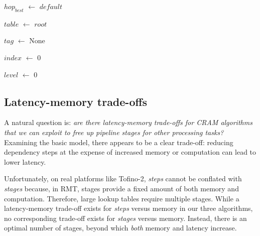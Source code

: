 \begin{algorithm}[h]

    $hop_{best}$ $\leftarrow$ $default$
    
    $table$ $\leftarrow$ $root$

    $tag$ $\leftarrow$ None
    
    $index$ $\leftarrow$ 0

    $level$ $\leftarrow$ 0

    \caption{\textbf{\mashup Lookup} ($addr$, $strides$)} \label{alg:mashup_lookup}
\end{algorithm}


\subsection{Latency-memory trade-offs} \label{subsec:tradeoff}

A natural question is: {\em are there latency-memory trade-offs for CRAM algorithms that we can exploit to free up pipeline stages for other processing tasks?} Examining the basic \cram model, there appears to be a clear trade-off: reducing dependency steps at the expense of increased memory or computation can lead to lower latency. 

Unfortunately, on real platforms like Tofino-2, {\em steps} cannot be conflated with {\em stages} because, in RMT, stages provide a fixed amount of both memory and computation. Therefore, large lookup tables require multiple stages. While a latency-memory trade-off exists for {\em steps} versus memory in our three \cram algorithms, no corresponding trade-off exists for {\em stages} versus memory. Instead, there is an optimal number of stages, beyond which {\em both} memory and latency increase.

